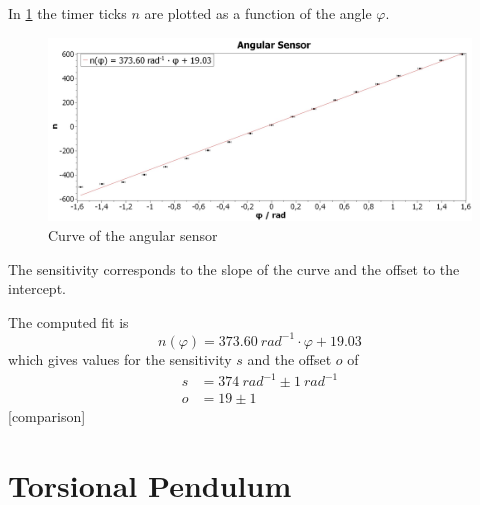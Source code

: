     In \cref{fig:angular-sensor} the timer ticks $ n $ are plotted as a function of the angle $ \varphi $.
    \begin{figure}[H]
        \centering
        \includegraphics[width=1\linewidth]{"messdaten/Angular Sensor"}
        \caption[Curve of the angular sensor]{Curve of the angular sensor}
        \label{fig:angular-sensor}
    \end{figure}
    The sensitivity corresponds to the slope of the curve and the offset to the intercept.\par
    The computed fit is
    \begin{equation}
        n(\varphi)=\SI{373.60}{rad^{-1}}\cdot\varphi +19.03
    \end{equation}
    which gives values for the sensitivity \( s \) and the offset \( o \) of
    \begin{align}
        s&=\SI{374}{rad^{-1}} \pm \SI{1}{rad^{-1}}\\
        o&=19 \pm 1
    \end{align}
    [comparison]

\section{Torsional Pendulum}

